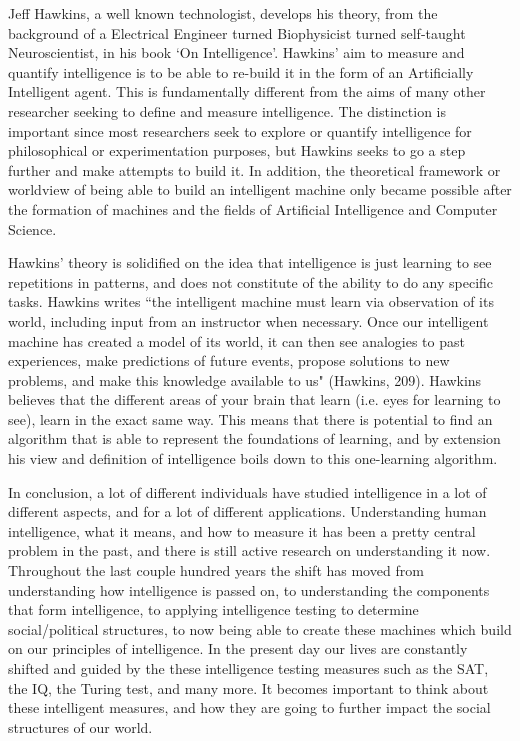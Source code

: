 \documentclass[12pt, oneside]{article}
\begin{document}
\par Jeff Hawkins, a well known technologist, develops his theory, from the background of a Electrical Engineer turned Biophysicist turned self-taught Neuroscientist, in his book `On Intelligence'. Hawkins' aim to measure and quantify intelligence is to be able to re-build it in the form of an Artificially Intelligent agent. This is fundamentally different from the aims of many other researcher seeking to define and measure intelligence. The distinction is important since most researchers seek to explore or quantify intelligence for philosophical or experimentation purposes, but Hawkins seeks to go a step further and make attempts to build it. In addition, the theoretical framework or worldview of being able to build an intelligent machine only became possible after the formation of machines and the fields of Artificial Intelligence and Computer Science.

\par Hawkins' theory is solidified on the idea that intelligence is just learning to see repetitions in patterns, and does not constitute of the ability to do any specific tasks. Hawkins writes ``the intelligent machine must learn via observation of its world, including input from an instructor when necessary. Once our intelligent machine has created a model of its world, it can then see analogies to past experiences, make predictions of future events, propose solutions to new problems, and make this knowledge available to us" (Hawkins, 209). Hawkins believes that the different areas of your brain that learn (i.e. eyes for learning to see), learn in the exact same way. This means that there is potential to find an algorithm that is able to represent the foundations of learning, and by extension his view and definition of intelligence boils down to this one-learning algorithm. 

\par In conclusion, a lot of different individuals have studied intelligence in a lot of different aspects, and for a lot of different applications. Understanding human intelligence, what it means, and how to measure it has been a pretty central problem in the past, and there is still active research on understanding it now. Throughout the last couple hundred years the shift has moved from understanding how intelligence is passed on, to understanding the components that form intelligence, to applying intelligence testing to determine social/political structures, to now being able to create these machines which build on our principles of intelligence. In the present day our lives are constantly shifted and guided by the these intelligence testing measures such as the SAT, the IQ, the Turing test, and many more. It becomes important to think about these intelligent measures, and how they are going to further impact the social structures of our world.
\end{document}
